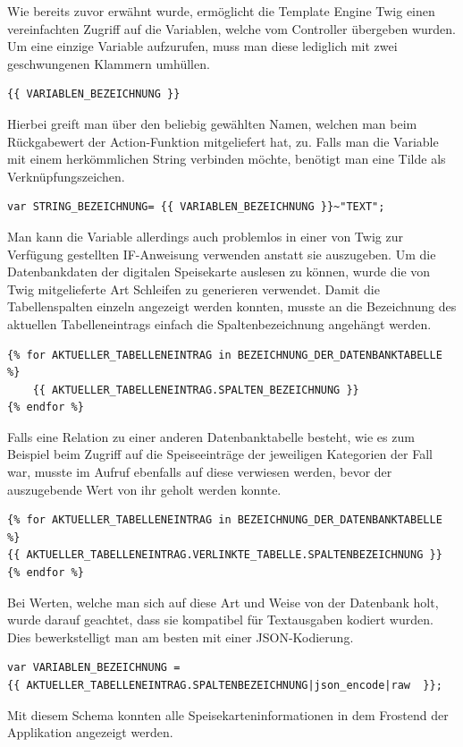 Wie bereits zuvor erwähnt wurde, ermöglicht die Template Engine Twig einen vereinfachten Zugriff auf die Variablen, welche vom Controller übergeben wurden. Um eine einzige Variable aufzurufen, muss man diese lediglich mit zwei geschwungenen Klammern umhüllen.
\lstset{language = php}
  	\begin{lstlisting}
{{ VARIABLEN_BEZEICHNUNG }}
\end{lstlisting}
Hierbei greift man über den beliebig gewählten Namen, welchen man beim Rückgabewert der Action-Funktion mitgeliefert hat, zu.
Falls man die Variable mit einem herkömmlichen String verbinden möchte, benötigt man eine Tilde als Verknüpfungszeichen.
\lstset{language = php}
  	\begin{lstlisting}
var STRING_BEZEICHNUNG= {{ VARIABLEN_BEZEICHNUNG }}~"TEXT";
	\end{lstlisting}
Man kann die Variable allerdings auch problemlos in einer von Twig zur Verfügung gestellten IF-Anweisung verwenden anstatt sie auszugeben.
Um die Datenbankdaten der digitalen Speisekarte auslesen zu können, wurde die von Twig mitgelieferte Art Schleifen zu generieren verwendet. Damit die Tabellenspalten einzeln angezeigt werden konnten, musste an die Bezeichnung des aktuellen Tabelleneintrags einfach die Spaltenbezeichnung angehängt werden.
\lstset{language = php}
  	\begin{lstlisting}
{% for AKTUELLER_TABELLENEINTRAG in BEZEICHNUNG_DER_DATENBANKTABELLE %}
	{{ AKTUELLER_TABELLENEINTRAG.SPALTEN_BEZEICHNUNG }}
{% endfor %}
	\end{lstlisting}
Falls eine Relation zu einer anderen Datenbanktabelle besteht, wie es zum Beispiel beim Zugriff auf die Speiseeinträge der jeweiligen Kategorien der Fall war, musste im Aufruf ebenfalls auf diese verwiesen werden, bevor der auszugebende Wert von ihr geholt werden konnte.
\lstset{language = php}
  	\begin{lstlisting}
{% for AKTUELLER_TABELLENEINTRAG in BEZEICHNUNG_DER_DATENBANKTABELLE %}
{{ AKTUELLER_TABELLENEINTRAG.VERLINKTE_TABELLE.SPALTENBEZEICHNUNG }}
{% endfor %}
	\end{lstlisting}
Bei Werten, welche man sich auf diese Art und Weise von der Datenbank holt, wurde darauf geachtet, dass sie kompatibel für Textausgaben kodiert wurden. Dies bewerkstelligt man am besten mit einer JSON-Kodierung.
\lstset{language = php}
  	\begin{lstlisting}
var VARIABLEN_BEZEICHNUNG =
{{ AKTUELLER_TABELLENEINTRAG.SPALTENBEZEICHNUNG|json_encode|raw  }};
	\end{lstlisting}
Mit diesem Schema konnten alle Speisekarteninformationen in dem Frostend der Applikation angezeigt werden.

